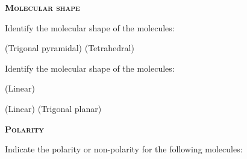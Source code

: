 \documentclass[main.tex]{subfiles}
\begin{document}
\begin{multicols*}{2}
{\raggedright\textsc{\textbf{Molecular shape}}\par}
\begin{question}[ID=\the\value{numA}]
Identify the molecular shape of the molecules:
\begin{inparaenum}[(a)]
\end{inparaenum}
\end{question}
\begin{solution} 
 \begin{inparaenum}[(a)]
  (Trigonal pyramidal)
  (Tetrahedral)
 \end{inparaenum}\hspace{0.1cm}\end{solution}
\begin{question}[ID=\the\value{numA}]
Identify the molecular shape of the molecules:
\begin{inparaenum}[(a)]
\item {}	%
\item  {}	%
\end{inparaenum}
\end{question}
\begin{solution} 
 \begin{inparaenum}[(a)]
\item {}	 (Linear)
\item  {}	(Linear)
    (Trigonal planar)
 \end{inparaenum}\hspace{0.1cm}\end{solution}



{\raggedright\textsc{\textbf{Polarity}}\par}

\begin{question}[ID=\the\value{numA}]
Indicate the polarity or non-polarity for the following molecules:
\begin{inparaenum}[(a)]
\item {}	%
\item  {}	%
\item  {}	%
\end{inparaenum}
\end{question}
\begin{solution} 
 \begin{inparaenum}[(a)]
\item {}	%
\item  {}	%
\item  {}	%
 \end{inparaenum}\hspace{0.1cm}\end{solution}


\end{multicols*}
\end{document}
